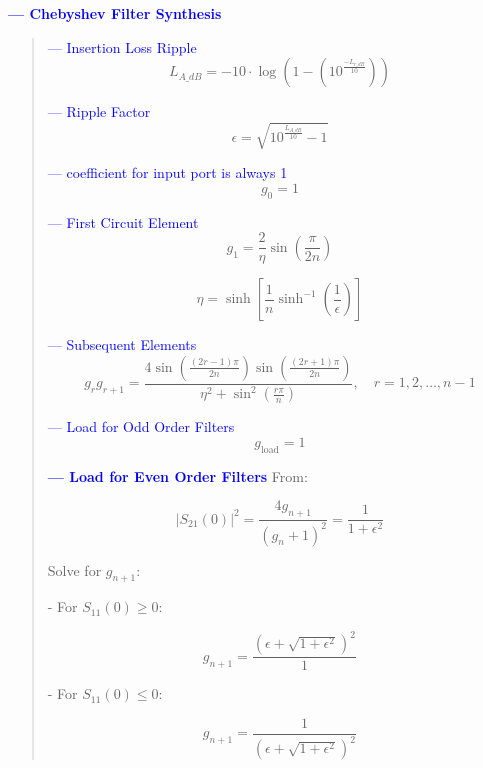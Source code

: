 \documentclass[10pt,conference]{IEEEtran}
\begin{document}
\textcolor{blue}{ \textbf{ --- Chebyshev Filter Synthesis} }
\begin{quote}

	\textcolor{blue}{ --- Insertion Loss Ripple}
	\begin{equation}\label{eq:insertion_loss}
	L_{A\_dB} = -10 \cdot \log \left( 1 - \left(10^{\frac{-L_{r\_dB}}{10}} \right) \right)
	\end{equation}

	\textcolor{blue}{ --- Ripple Factor}
	\begin{equation}\label{eq:ripple_factor}
	\epsilon = \sqrt{10^{\frac{L_{A\_dB}}{10}} - 1}
	\end{equation}

	\textcolor{blue}{ --- coefficient for input port is always 1}
	\begin{equation}\label{eq:g0}
	g_0 = 1
	\end{equation}

	\textcolor{blue}{ --- First Circuit Element }
	\begin{equation}\label{eq:g1}
	g_1 = \frac{2}{\eta} \sin\left( \frac{\pi}{2n} \right)
	\end{equation}

	\begin{equation}\label{eq:eta}
	\eta = \sinh \left[ \frac{1}{n} \sinh^{-1} \left( \frac{1}{\epsilon} \right) \right]
	\end{equation}

	\textcolor{blue}{ --- Subsequent Elements }
	\begin{equation}\label{eq:gr}
	g_r g_{r+1} = \frac{4 \sin \left( \frac{(2r - 1)\pi}{2n} \right) \sin \left( \frac{(2r + 1)\pi}{2n} \right)}{\eta^2 + \sin^2 \left( \frac{r\pi}{n} \right)}, \quad r = 1, 2, \ldots, n-1
	\end{equation}

	\textcolor{blue}{ --- Load for Odd Order Filters }
	\begin{equation}\label{eq:gload_odd}
	g_{\text{load}} = 1
	\end{equation}

	\textcolor{blue}{ \textbf{ --- Load for Even Order Filters} }
	From:

	\begin{equation}\label{eq:s21}
	|S_{21}(0)|^2 = \frac{4g_{n+1}}{(g_n + 1)^2} = \frac{1}{1 + \epsilon^2}
	\end{equation}

	Solve for \( g_{n+1} \):

	- For \( S_{11}(0) \geq 0 \):

	\begin{equation}\label{eq:gnp1_positive}
	g_{n+1} = \frac{\left( \epsilon + \sqrt{1 + \epsilon^2} \right)^2}{1}
	\end{equation}

	- For \( S_{11}(0) \leq 0 \):

	\begin{equation}\label{eq:gnp1_negative}
	g_{n+1} = \frac{1}{\left( \epsilon + \sqrt{1 + \epsilon^2} \right)^2}
	\end{equation}

\end{quote}
\end{document}
